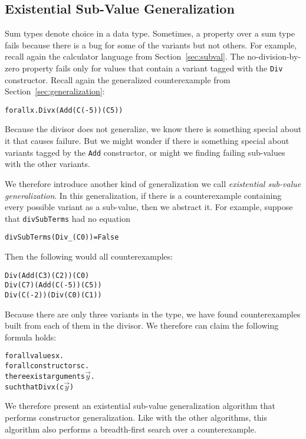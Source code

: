 \documentclass{sigplanconf}
\newenvironment{code}{\begin{alltt}\footnotesize}{\end{alltt}}
\newcommand{\ttp}[1]{\texttt{#1}}
\begin{document}
\subsection{Existential Sub-Value Generalization}\label{sec:existential}

Sum types denote choice in a data type.  Sometimes, a property over a sum type
fails because there is a bug for some of the variants but not others.  For
example, recall again the calculator language from Section~\ref{sec:subval}.  The
no-division-by-zero property fails only for values that contain a variant tagged
with the \ttp{Div} constructor.  Recall again the generalized counterexample
from Section~\ref{sec:generalization}:
%
\begin{code}
forall x . Div x (Add (C (-5)) (C 5))
\end{code}
%
\noindent
Because the divisor does not generalize, we know there is something special
about it that causes failure.  But we might wonder if there is something special
about variants tagged by the \ttp{Add} constructor, or might we finding failing
sub-values with the other variants.

We therefore introduce another kind of generalization we call \emph{existential
  sub-value generalization}.  In this generalization, if there is a
counterexample containing every possible variant as a sub-value, then we
abstract it.  For example, suppose that \ttp{divSubTerms} had no equation
%
\begin{code}
divSubTerms (Div _ (C 0)) = False
\end{code}
%
\noindent
Then the following would all counterexamples:
%
\begin{code}
Div (Add (C 3) (C 2)) (C 0)
Div (C 7) (Add (C (-5)) (C 5))
Div (C (-2)) (Div (C 0) (C 1))
\end{code}
%
\noindent
Because there are only three variants in the type, we have found counterexamples
built from each of them in the divisor.  We therefore can claim the following
formula holds:
%
\begin{code}
forall values x .
  forall constructors c .
    there exist arguments \(\stackrel{\rightarrow}{y}\) .
      such that Div x (c\(\stackrel{\rightarrow}{y}\))
\end{code}
%
\noindent
We therefore present an existential sub-value generalization algorithm that
performs constructor generalization.  Like with the other algorithms, this
algorithm also performs a breadth-first search over a counterexample.
\end{document}
